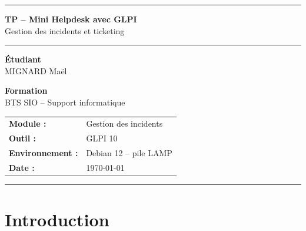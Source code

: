 \documentclass[a4paper,11pt]{article}
\begin{document}
\begin{titlepage}
\thispagestyle{empty}
\centering

\vspace*{1.5cm}
{\color{glpiblue}\rule{\textwidth}{3pt}}
\vspace{0.6cm}

{\Huge\bfseries\color{glpiblue} TP -- Mini Helpdesk avec GLPI}\\[0.4cm]
{\Large\color{glpiblue!80!black} Gestion des incidents et ticketing}

\vspace{0.6cm}
{\color{glpiblue}\rule{\textwidth}{3pt}}

\vspace{2.5cm}

\begin{minipage}[t]{0.45\textwidth}
\centering
{\large\bfseries\color{glpiblue} Étudiant}\\[0.5cm]
{\large MIGNARD Maël}
\end{minipage}
\hfill
\begin{minipage}[t]{0.45\textwidth}
\centering
{\large\bfseries\color{glpiblue} Formation}\\[0.5cm]
{\large BTS SIO -- Support informatique}
\end{minipage}

\vfill

\begin{center}
\begin{tabular}{ll}
\textbf{Module :}        & Gestion des incidents \\[4pt]
\textbf{Outil :}         & GLPI 10 \\[4pt]
\textbf{Environnement :} & Debian 12 -- pile LAMP \\[4pt]
\textbf{Date :}          & \today \\
\end{tabular}
\end{center}

\vspace{1.2cm}
{\color{glpiblue!50}\rule{\textwidth}{0.8pt}}
\end{titlepage}

\tableofcontents
\newpage

\section{Introduction}
\end{document}
